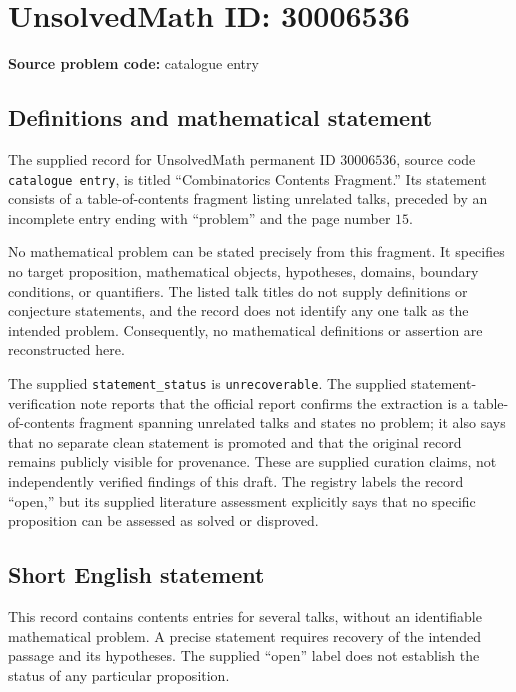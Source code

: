 \documentclass[11pt]{article}
\begin{document}
\section*{UnsolvedMath ID: 30006536}
\textbf{Source problem code:} catalogue entry
\subsection{Definitions and mathematical statement}
The supplied record for UnsolvedMath permanent ID \(30006536\), source code \texttt{catalogue entry}, is titled ``Combinatorics Contents Fragment.'' Its statement consists of a table-of-contents fragment listing unrelated talks, preceded by an incomplete entry ending with ``problem'' and the page number \(15\).

No mathematical problem can be stated precisely from this fragment. It specifies no target proposition, mathematical objects, hypotheses, domains, boundary conditions, or quantifiers. The listed talk titles do not supply definitions or conjecture statements, and the record does not identify any one talk as the intended problem. Consequently, no mathematical definitions or assertion are reconstructed here.

The supplied \texttt{statement\_status} is \texttt{unrecoverable}. The supplied statement-verification note reports that the official report confirms the extraction is a table-of-contents fragment spanning unrelated talks and states no problem; it also says that no separate clean statement is promoted and that the original record remains publicly visible for provenance. These are supplied curation claims, not independently verified findings of this draft. The registry labels the record ``open,'' but its supplied literature assessment explicitly says that no specific proposition can be assessed as solved or disproved.
\subsection{Short English statement}
This record contains contents entries for several talks, without an identifiable mathematical problem. A precise statement requires recovery of the intended passage and its hypotheses. The supplied ``open'' label does not establish the status of any particular proposition.
\end{document}
